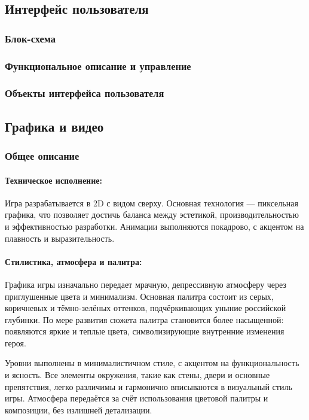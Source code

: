 \documentclass[12pt]{article}
\begin{document}
    \subsection{Интерфейс пользователя}
        \subsubsection{Блок-схема}
        \subsubsection{Функциональное описание и управление}
        \subsubsection{Объекты интерфейса пользователя}
    \subsection{Графика и видео}
    \subsubsection{Общее описание}
        \paragraph{Техническое исполнение:} 
        Игра разрабатывается в 2D с видом сверху. Основная технология — пиксельная графика, что позволяет достичь баланса между эстетикой, производительностью и эффективностью разработки. Анимации выполняются покадрово, с акцентом на плавность и выразительность.
        
        \paragraph{Стилистика, атмосфера и палитра:} 
        Графика игры изначально передает мрачную, депрессивную атмосферу через приглушенные цвета и минимализм. Основная палитра состоит из серых, коричневых и тёмно-зелёных оттенков, подчёркивающих уныние российской глубинки. По мере развития сюжета палитра становится более насыщенной: появляются яркие и теплые цвета, символизирующие внутренние изменения героя.
        
        Уровни выполнены в минималистичном стиле, с акцентом на функциональность и ясность. Все элементы окружения, такие как стены, двери и основные препятствия, легко различимы и гармонично вписываются в визуальный стиль игры. Атмосфера передаётся за счёт использования цветовой палитры и композиции, без излишней детализации.
        
\end{document}
